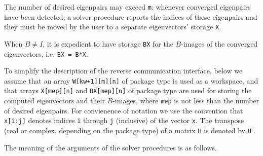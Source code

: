 The number of desired eigenpairs may exceed {\tt m}:
whenever converged eigenpairs have been detected,
a solver procedure reports the indices of these eigenpairs
and they must be moved by the user
to a separate eigenvectors' storage {\tt X}.

When $B \ne I$,
it is expedient to 
have
storage {\tt BX}
for the $B$-images of the converged eigenvectors,
i.e. {\tt BX = B*X}.

To simplify the description of the
reverse communication interface,
below we assume that an array
{\tt W[kw+1][m][n]} of package type
is used as a workspace,
and that arrays {\tt X[mep][n]} and {\tt BX[mep][n]} of package type
are used for storing the computed eigenvectors
and their $B$-images,
where {\tt mep} is not less than the number of desired eigenpairs.
For convienence of notation we use the convention that \texttt{x[i:j]}
denotes indices {\tt i} through {\tt j} (inclusive) of the vector {\tt x}.
The transpose (real or complex, depending on the package type)
of a matrix {\tt H} 
is denoted by {\tt H}$^\prime$.

\medskip
\noindent
The meaning of the arguments of the solver procedures is as follows.

